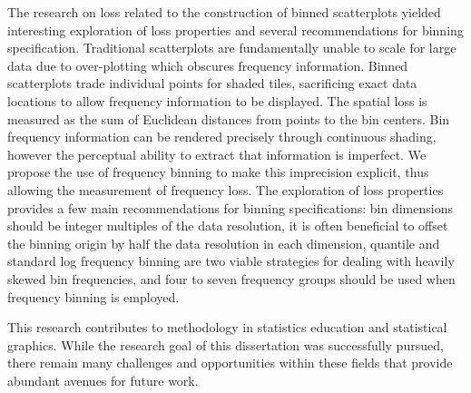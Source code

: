 \documentclass[11pt]{isuthesis}\usepackage[]{graphicx}\usepackage[]{color}
\newcommand\chaptocbreak{
	\addtocontents{toc}{\protect\needspace{4\baselineskip}}
	\addtocontents{lof}{\protect\needspace{2\baselineskip}}
	\addtocontents{lot}{\protect\needspace{2\baselineskip}}
}
\begin{document}
The research on loss related to the construction of binned scatterplots yielded interesting exploration of loss properties and several recommendations for binning specification. Traditional scatterplots are fundamentally unable to scale for large data due to over-plotting which obscures frequency information. Binned scatterplots trade individual points for shaded tiles, sacrificing exact data locations to allow frequency information to be displayed. The spatial loss is measured as the sum of Euclidean distances from points to the bin centers. Bin frequency information can be rendered precisely through continuous shading, however the perceptual ability to extract that information is imperfect. We propose the use of frequency binning to make this imprecision explicit, thus allowing the measurement of frequency loss. The exploration of loss properties provides a few main recommendations for binning specifications: bin dimensions should be integer multiples of the data resolution, it is often beneficial to offset the binning origin by half the data resolution in each dimension, quantile and standard log frequency binning are two viable strategies for dealing with heavily skewed bin frequencies, and four to seven frequency groups should be used when frequency binning is employed.

This research contributes to methodology in statistics education and statistical graphics. While the research goal of this dissertation was successfully pursued, there remain many challenges and opportunities within these fields that provide abundant avenues for future work. 
\chaptocbreak
\end{document}
